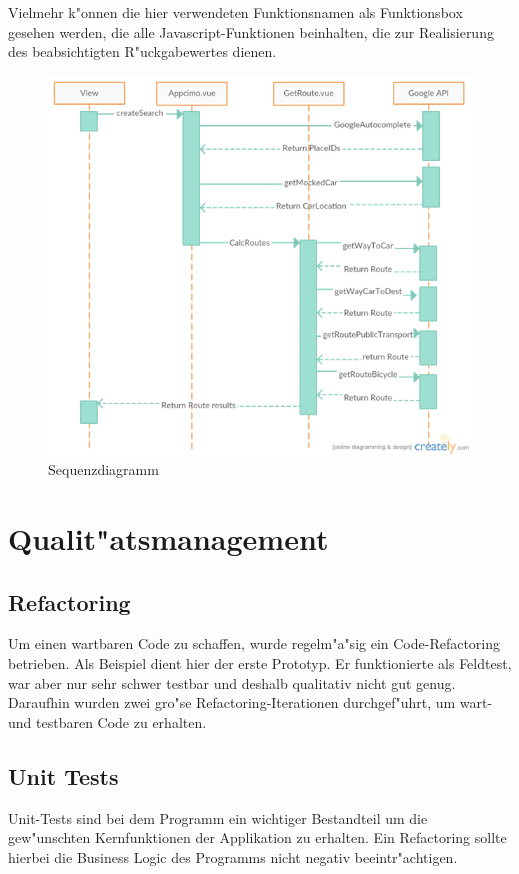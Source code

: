 \documentclass[a4paper, 11pt]{scrreprt}
\begin{document}
Vielmehr k"onnen die hier verwendeten Funktionsnamen als Funktionsbox gesehen werden, die alle Javascript-Funktionen beinhalten, die zur Realisierung des beabsichtigten R"uckgabewertes dienen.

\begin{figure} [H]
\begin{center}
\includegraphics[scale=1]{sequenzdiagramm.png}
\caption{Sequenzdiagramm}
\label{Sequenzdiagramm}
\end{center}
\end{figure}

\section{Qualit"atsmanagement}

\subsection{Refactoring}
Um einen wartbaren Code zu schaffen, wurde regelm"a"sig ein Code-Refactoring betrieben.
Als Beispiel dient hier der erste Prototyp. Er funktionierte als Feldtest, war aber nur sehr schwer testbar und deshalb qualitativ nicht gut genug. Daraufhin wurden zwei gro"se Refactoring-Iterationen durchgef"uhrt, um wart- und testbaren Code zu erhalten.


\subsection{Unit Tests}
Unit-Tests sind bei dem Programm ein wichtiger Bestandteil um die gew"unschten Kernfunktionen der Applikation zu erhalten. Ein Refactoring sollte hierbei die Business Logic des Programms nicht negativ beeintr"achtigen.\\
\end{document}
